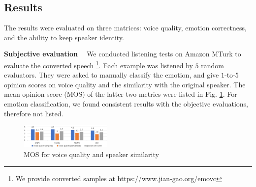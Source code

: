 \documentclass{article}
\begin{document}
\subsection{Results}
The results were evaluated on three matrices: voice quality, emotion correctness, and the ability to keep speaker identity.

\noindent \textbf{Subjective evaluation \ } We conducted listening tests on Amazon MTurk to evaluate the converted speech \footnote{We provide converted samples at https://www.jian-gao.org/emovc}. Each example was listened by $5$ random evaluators. They were asked to manually classify the emotion, and give $1$-to-$5$ opinion scores on voice quality and the similarity with the original speaker. The mean opinion score (MOS) of the latter two metrics were listed in Fig. \ref{fig:mos}. For emotion classification, we found consistent results with the objective evaluations, therefore not listed.



\begin{figure}[htb]
\center
\includegraphics[width=0.4\textwidth]{FIG/MOS}
\caption{MOS for voice quality and speaker similarity}
\label{fig:mos}
\end{figure}

\end{document}
